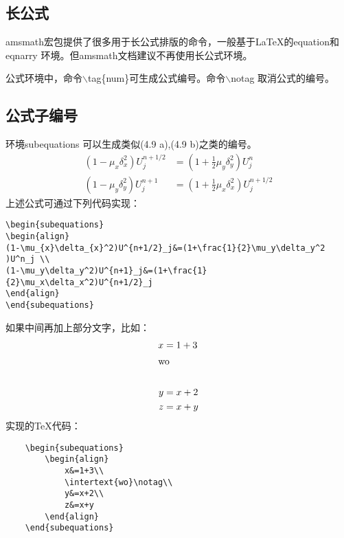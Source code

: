 \subsection{长公式}
amsmath宏包提供了很多用于长公式排版的命令，一般基于\LaTeX 的equation和eqnarry 环境。但amsmath文档建议不再使用长公式环境。

公式环境中，命令$\backslash$tag\{num\}可生成公式编号。命令$\backslash$notag 取消公式的编号。

\subsection{公式子编号}
环境subequations 可以生成类似(4.9 a),(4.9 b)之类的编号。
\begin{subequations}
	\begin{align}
	(1-\mu_{x}\delta_{x}^2)U^{n+1/2}_j&=(1+\frac{1}{2}\mu_y\delta_y^2 )U^n_j \\
	(1-\mu_y\delta_y^2)U^{n+1}_j&=(1+\frac{1}{2}\mu_x\delta_x^2)U^{n+1/2}_j
	\end{align}
\end{subequations}
上述公式可通过下列代码实现：
\begin{lstlisting}
\begin{subequations}
\begin{align}
(1-\mu_{x}\delta_{x}^2)U^{n+1/2}_j&=(1+\frac{1}{2}\mu_y\delta_y^2 )U^n_j \\
(1-\mu_y\delta_y^2)U^{n+1}_j&=(1+\frac{1}{2}\mu_x\delta_x^2)U^{n+1/2}_j
\end{align}
\end{subequations}
\end{lstlisting}
如果中间再加上部分文字，比如：
\begin{subequations}
	\begin{align}
		x&=1+3\\
		\intertext{wo}\notag\\
		y&=x+2\\
		z&=x+y
	\end{align}
\end{subequations}
实现的\TeX{}代码：
\begin{lstlisting}
	\begin{subequations}
		\begin{align}
			x&=1+3\\
			\intertext{wo}\notag\\
			y&=x+2\\
			z&=x+y
		\end{align}
	\end{subequations}
\end{lstlisting}

